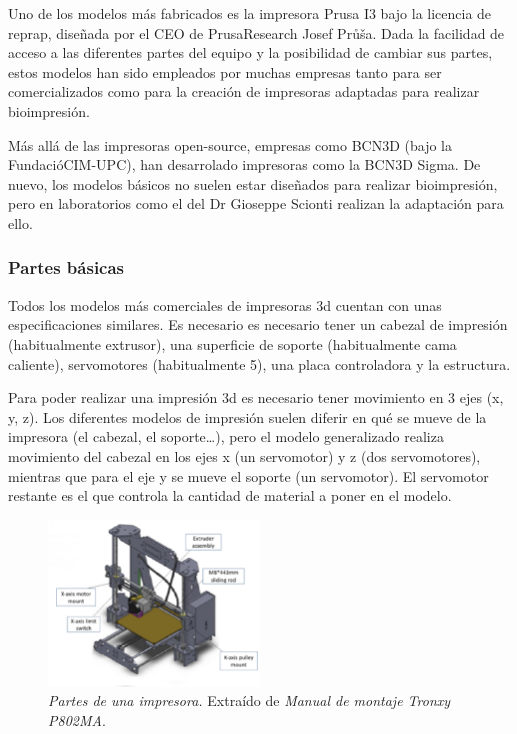\documentclass[a4paper,12pt]{article}
\begin{document}
Uno de los modelos más fabricados es la impresora Prusa I3 bajo la licencia de reprap, diseñada por el CEO de PrusaResearch Josef Průša. Dada la facilidad de acceso a las diferentes partes del equipo y la posibilidad de cambiar sus partes, estos modelos han sido empleados por muchas empresas tanto para ser comercializados como para la creación de impresoras adaptadas para realizar bioimpresión.

Más allá de las impresoras open-source, empresas como BCN3D (bajo la FundacióCIM-UPC), han desarrolado impresoras como la BCN3D Sigma. De nuevo, los modelos básicos no suelen estar diseñados para realizar bioimpresión, pero en laboratorios como el del Dr Gioseppe Scionti realizan la adaptación para ello.

\subsubsection{Partes básicas}
Todos los modelos más comerciales de impresoras 3d cuentan con unas especificaciones similares. Es necesario es necesario tener un cabezal de impresión (habitualmente extrusor), una superficie de soporte (habitualmente cama caliente), servomotores (habitualmente 5), una placa controladora y la estructura.

Para poder realizar una impresión 3d es necesario tener movimiento en 3 ejes (x, y, z). Los diferentes modelos de impresión suelen diferir en qué se mueve de la impresora (el cabezal, el soporte…), pero el modelo generalizado realiza movimiento del cabezal en los ejes x (un servomotor) y z (dos servomotores), mientras que para el eje y se mueve el soporte (un servomotor). El servomotor restante es el que controla la cantidad de material a poner en el modelo.

	\begin{figure}[!ht]
	\begin{center}
	  \includegraphics[width=0.5\textwidth]{Figuras/partesImpresora.eps}
	  \caption{\emph{Partes de una impresora. }Extraído de \emph{Manual de montaje Tronxy P802MA}.}
	\end{center}
	\label{partesImpresora}
	\end{figure}
\end{document}
